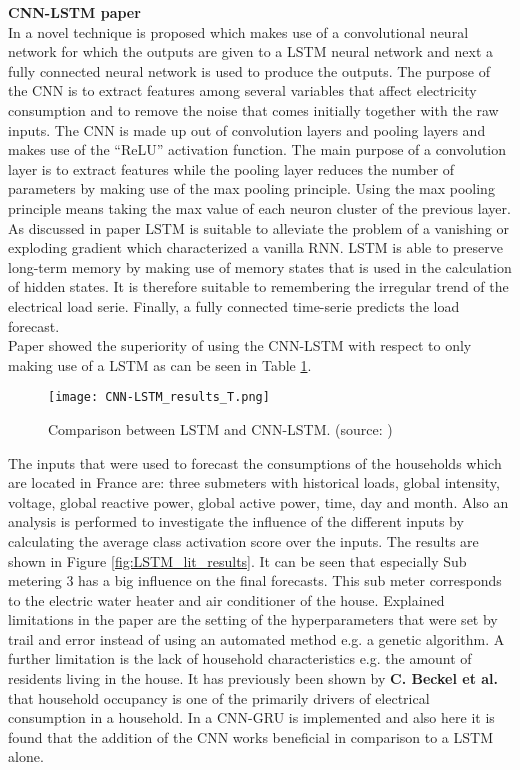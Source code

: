\textbf{CNN-LSTM paper}\\
In \cite{Kim2019} a novel technique is proposed which makes use of a convolutional neural network for which the outputs are given to a LSTM neural network and next a fully connected neural network  is used to produce the outputs. The purpose of the CNN is to extract features among several variables that affect electricity consumption and to remove the noise that comes initially together with the raw inputs. The CNN is made up out of convolution layers and pooling layers and makes use of the ``ReLU'' activation function. The main purpose of a convolution layer is to extract features while the pooling layer reduces the number of parameters by making use of the max pooling principle. Using the max pooling principle means taking the max value of each neuron cluster of the previous layer. As discussed in paper \cite{Kong2019} LSTM is suitable to alleviate the problem of a vanishing or exploding gradient which characterized a vanilla RNN. LSTM is able to preserve long-term memory by making use of memory states that is used in the calculation of hidden states. It is therefore suitable to remembering the irregular trend of the electrical load serie. Finally, a fully connected time-serie predicts the load forecast.\\
Paper \cite{Kim2019} showed the superiority of using the CNN-LSTM with respect to only making use of a LSTM as can be seen in Table \ref{tab:CNN-LSTM_lit_results}. 

\begin{figure}[h!]
	\centering
	\texttt{[image: CNN-LSTM\_results\_T.png]}
	\caption{Comparison between LSTM and CNN-LSTM. (source: \cite{Kim2019})}
	\label{tab:CNN-LSTM_lit_results}
\end{figure}

The inputs that were used to forecast the consumptions of the households which are located in France are: three submeters with historical loads, global intensity, voltage, global reactive power, global active power, time, day and month. 
Also an analysis is performed to investigate the influence of the different inputs by calculating the average class activation score over the inputs. The results are shown in Figure \ref{fig:LSTM_lit_results}. It can be seen that especially Sub metering $ 3 $ has a big influence on the final forecasts. This sub meter corresponds to the electric water heater and air conditioner of the house. Explained limitations in the paper are the setting of the hyperparameters that were set by trail and error instead of using an automated method e.g. a genetic algorithm. A further limitation is the lack of household characteristics e.g. the amount of residents living in the house. It has previously been shown by \textbf{C. Beckel et al.} that household occupancy is one of the primarily drivers of electrical consumption in a household. In \cite{Sajjad2020} a CNN-GRU is implemented and also here it is found that the addition of the CNN works beneficial in comparison to a LSTM alone.\\

